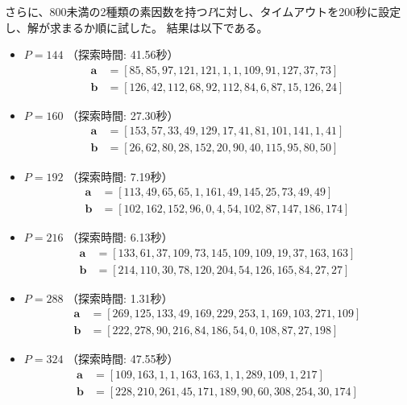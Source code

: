\documentclass[a4paper,11pt,dvipdfmx]{jsarticle}
\theoremstyle{definition}
\begin{document}
さらに、800未満の2種類の素因数を持つ$P$に対し、タイムアウトを200秒に設定し、解が求まるか順に試した。
結果は以下である。
\begin{itemize}
    \item \textbf{$P = 144$} （探索時間: 41.56秒）
    \begin{align*}
        \bm{a} &= [85, 85, 97, 121, 121, 1, 1, 109, 91, 127, 37, 73] \\
        \bm{b} &= [126, 42, 112, 68, 92, 112, 84, 6, 87, 15, 126, 24]
    \end{align*}

    \item \textbf{$P = 160$} （探索時間: 27.30秒）
    \begin{align*}
        \bm{a} &= [153, 57, 33, 49, 129, 17, 41, 81, 101, 141, 1, 41] \\
        \bm{b} &= [26, 62, 80, 28, 152, 20, 90, 40, 115, 95, 80, 50]
    \end{align*}

    \item \textbf{$P = 192$} （探索時間: 7.19秒）
    \begin{align*}
        \bm{a} &= [113, 49, 65, 65, 1, 161, 49, 145, 25, 73, 49, 49] \\
        \bm{b} &= [102, 162, 152, 96, 0, 4, 54, 102, 87, 147, 186, 174]
    \end{align*}

    \item \textbf{$P = 216$} （探索時間: 6.13秒）
    \begin{align*}
        \bm{a} &= [133, 61, 37, 109, 73, 145, 109, 109, 19, 37, 163, 163] \\
        \bm{b} &= [214, 110, 30, 78, 120, 204, 54, 126, 165, 84, 27, 27]
    \end{align*}

    \item \textbf{$P = 288$} （探索時間: 1.31秒）
    \begin{align*}
        \bm{a} &= [269, 125, 133, 49, 169, 229, 253, 1, 169, 103, 271, 109] \\
        \bm{b} &= [222, 278, 90, 216, 84, 186, 54, 0, 108, 87, 27, 198]
    \end{align*}

    \item \textbf{$P = 324$} （探索時間: 47.55秒）
    \begin{align*}
        \bm{a} &= [109, 163, 1, 1, 163, 163, 1, 1, 289, 109, 1, 217] \\
        \bm{b} &= [228, 210, 261, 45, 171, 189, 90, 60, 308, 254, 30, 174]
    \end{align*}


\end{itemize}
\end{document}
